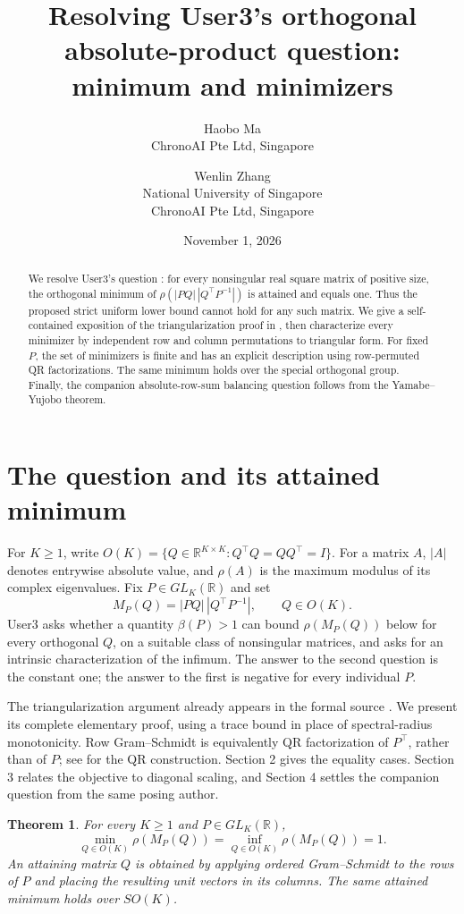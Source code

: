 \documentclass[11pt]{article}
\title{Resolving User3's orthogonal absolute-product question:\\minimum and minimizers}
\author{Haobo Ma\\\small ChronoAI Pte Ltd, Singapore
\and Wenlin Zhang\\\small National University of Singapore\\\small ChronoAI Pte Ltd, Singapore}
\date{November 1, 2026}
\newtheorem{theorem}{Theorem}
\newcommand{\RR}{\mathbb R}
\begin{document}
\maketitle
\begin{abstract}
We resolve User3's question \cite[question 515549, revision 1,
September 25, 2026]{question}: for every nonsingular real square matrix
of positive size, the orthogonal minimum of
$\rho(|PQ|\,|Q^\top P^{-1}|)$ is attained and equals one.
Thus the proposed strict uniform lower bound cannot hold for any such
matrix. We give a self-contained exposition of the triangularization
proof in \cite{formal}, then characterize every minimizer by independent
row and column permutations to triangular form. For fixed $P$, the set
of minimizers is finite and has an explicit description using row-permuted
QR factorizations. The same minimum holds over the special orthogonal
group. Finally, the companion absolute-row-sum balancing question
\cite{balance} follows from the Yamabe--Yujobo theorem.
\end{abstract}

\section{The question and its attained minimum}

For $K\geq1$, write $O(K)=\{Q\in\RR^{K\times K}:Q^\top Q=QQ^\top=I\}$.
For a matrix $A$, $|A|$ denotes entrywise absolute value, and $\rho(A)$
is the maximum modulus of its complex eigenvalues. Fix
$P\in GL_K(\RR)$ and set
\[
 M_P(Q)=|PQ|\,|Q^\top P^{-1}|,\qquad Q\in O(K).
\]
User3 \cite{question} asks whether a quantity $\beta(P)>1$ can bound
$\rho(M_P(Q))$ below for every orthogonal $Q$, on a suitable class of
nonsingular matrices, and asks for an intrinsic characterization of the
infimum. The answer to the second question is the constant one; the answer
to the first is negative for every individual $P$.

The triangularization argument already appears in the formal source
\cite[\texttt{result}]{formal}. We present its complete elementary proof,
using a trace bound in place of spectral-radius monotonicity. Row
Gram--Schmidt is equivalently QR factorization of $P^\top$, rather than
of $P$; see \cite{qr} for the QR construction. Section 2 gives the equality
cases. Section 3 relates the objective to diagonal scaling, and Section 4
settles the companion question from the same posing author.

\begin{theorem}\label{thm:minimum}
For every $K\geq1$ and $P\in GL_K(\RR)$,
\[
 \min_{Q\in O(K)}\rho(M_P(Q))
 =\inf_{Q\in O(K)}\rho(M_P(Q))=1.
\]
An attaining matrix $Q$ is obtained by applying ordered Gram--Schmidt to
the rows of $P$ and placing the resulting unit vectors in its columns.
The same attained minimum holds over $SO(K)$.
\end{theorem}
\end{document}
